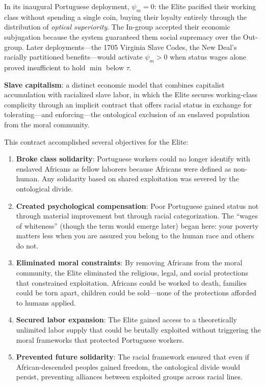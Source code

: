 \documentclass[12pt,openany]{book}
\begin{document}
In its inaugural Portuguese deployment, $\psi_m = 0$: the Elite pacified their working class without spending a single coin, buying their loyalty entirely through the distribution of \textit{optical superiority}. The In-group accepted their economic subjugation because the system guaranteed them social supremacy over the Out-group. Later deployments---the 1705 Virginia Slave Codes, the New Deal's racially partitioned benefits---would activate $\psi_m > 0$ when status wages alone proved insufficient to hold $\min$ below $\tau$.

\begin{definition}
\textbf{Slave capitalism}: a distinct economic model that combines capitalist accumulation with racialized slave labor, in which the Elite secures working-class complicity through an implicit contract that offers racial status in exchange for tolerating---and enforcing---the ontological exclusion of an enslaved population from the moral community.
\end{definition}

This contract accomplished several objectives for the Elite:

\begin{enumerate}
    \item \textbf{Broke class solidarity}: Portuguese workers could no longer identify with enslaved Africans as fellow laborers because Africans were defined as non-human. Any solidarity based on shared exploitation was severed by the ontological divide.
    
    \item \textbf{Created psychological compensation}: Poor Portuguese gained status not through material improvement but through racial categorization. The ``wages of whiteness'' (though the term would emerge later) began here: your poverty matters less when you are assured you belong to the human race and others do not.
    
    \item \textbf{Eliminated moral constraints}: By removing Africans from the moral community, the Elite eliminated the religious, legal, and social protections that constrained exploitation. Africans could be worked to death, families could be torn apart, children could be sold---none of the protections afforded to humans applied.
    
    \item \textbf{Secured labor expansion}: The Elite gained access to a theoretically unlimited labor supply that could be brutally exploited without triggering the moral frameworks that protected Portuguese workers.
    
    \item \textbf{Prevented future solidarity}: The racial framework ensured that even if African-descended peoples gained freedom, the ontological divide would persist, preventing alliances between exploited groups across racial lines.
\end{enumerate}
\end{document}
